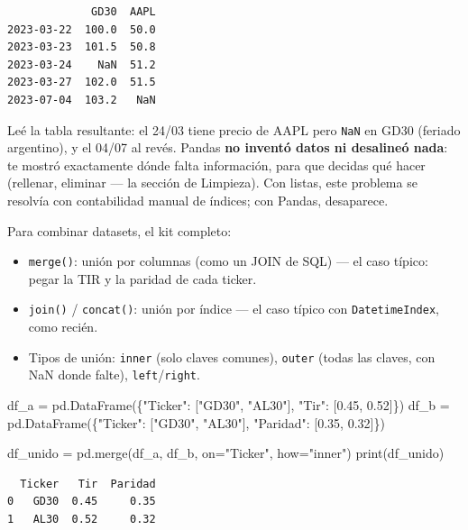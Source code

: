 \documentclass[
  spanish,
  letterpaper,
  DIV=11,
  numbers=noendperiod]{scrreprt}
\newenvironment{Shaded}{\begin{snugshade}}{\end{snugshade}}
\newcommand{\BuiltInTok}[1]{\textcolor[rgb]{0.00,0.23,0.31}{#1}}
\newcommand{\FloatTok}[1]{\textcolor[rgb]{0.68,0.00,0.00}{#1}}
\newcommand{\NormalTok}[1]{\textcolor[rgb]{0.00,0.23,0.31}{#1}}
\newcommand{\OperatorTok}[1]{\textcolor[rgb]{0.37,0.37,0.37}{#1}}
\newcommand{\StringTok}[1]{\textcolor[rgb]{0.13,0.47,0.30}{#1}}
\providecommand{\tightlist}{%
  \setlength{\itemsep}{0pt}\setlength{\parskip}{0pt}}
\begin{document}
\begin{verbatim}
             GD30  AAPL
2023-03-22  100.0  50.0
2023-03-23  101.5  50.8
2023-03-24    NaN  51.2
2023-03-27  102.0  51.5
2023-07-04  103.2   NaN
\end{verbatim}

Leé la tabla resultante: el 24/03 tiene precio de AAPL pero \texttt{NaN}
en GD30 (feriado argentino), y el 04/07 al revés. Pandas \textbf{no
inventó datos ni desalineó nada}: te mostró exactamente dónde falta
información, para que decidas qué hacer (rellenar, eliminar --- la
sección de Limpieza). Con listas, este problema se resolvía con
contabilidad manual de índices; con Pandas, desaparece.

Para combinar datasets, el kit completo:

\begin{itemize}
\tightlist
\item
  \texttt{merge()}: unión por columnas (como un JOIN de SQL) --- el caso
  típico: pegar la TIR y la paridad de cada ticker.
\item
  \texttt{join()} / \texttt{concat()}: unión por índice --- el caso
  típico con \texttt{DatetimeIndex}, como recién.
\item
  Tipos de unión: \texttt{inner} (solo claves comunes), \texttt{outer}
  (todas las claves, con NaN donde falte), \texttt{left}/\texttt{right}.
\end{itemize}

\label{merge-ejemplo}
\begin{Shaded}
\begin{Highlighting}[]
\NormalTok{df\_a }\OperatorTok{=}\NormalTok{ pd.DataFrame(\{}\StringTok{"Ticker"}\NormalTok{: [}\StringTok{"GD30"}\NormalTok{, }\StringTok{"AL30"}\NormalTok{], }\StringTok{"Tir"}\NormalTok{: [}\FloatTok{0.45}\NormalTok{, }\FloatTok{0.52}\NormalTok{]\})}
\NormalTok{df\_b }\OperatorTok{=}\NormalTok{ pd.DataFrame(\{}\StringTok{"Ticker"}\NormalTok{: [}\StringTok{"GD30"}\NormalTok{, }\StringTok{"AL30"}\NormalTok{], }\StringTok{"Paridad"}\NormalTok{: [}\FloatTok{0.35}\NormalTok{, }\FloatTok{0.32}\NormalTok{]\})}

\NormalTok{df\_unido }\OperatorTok{=}\NormalTok{ pd.merge(df\_a, df\_b, on}\OperatorTok{=}\StringTok{"Ticker"}\NormalTok{, how}\OperatorTok{=}\StringTok{"inner"}\NormalTok{)}
\BuiltInTok{print}\NormalTok{(df\_unido)}
\end{Highlighting}
\end{Shaded}

\begin{verbatim}
  Ticker   Tir  Paridad
0   GD30  0.45     0.35
1   AL30  0.52     0.32
\end{verbatim}
\end{document}
